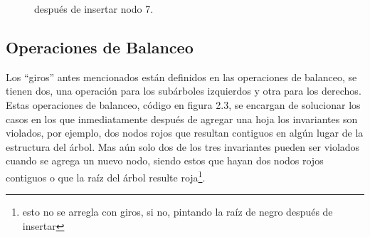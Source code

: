 \begin{figure}
\centering
\captionsetup{justification=centering}
\label{arbolRB_3}
\caption{{\Arn} después de insertar nodo 7.}
\end{figure}
\subsection{Operaciones de Balanceo}
Los ``giros'' antes mencionados están definidos en las operaciones de balanceo, se tienen dos, una
operaci\'on para los subárboles izquierdos y otra para los derechos. Estas operaciones de
balanceo, c\'odigo en figura 2.3, se encargan de solucionar los casos en los que inmediatamente
después de agregar una hoja los invariantes son violados, por ejemplo, dos nodos rojos que
resultan contiguos en algún lugar de la estructura del \'arbol. Mas a\'un solo dos de los tres
invariantes pueden ser violados cuando se agrega un nuevo nodo, siendo estos que hayan dos nodos
rojos contiguos o que la raíz del árbol resulte roja\footnote{esto no se arregla con giros, si no,
pintando la raíz de negro después de insertar}.

